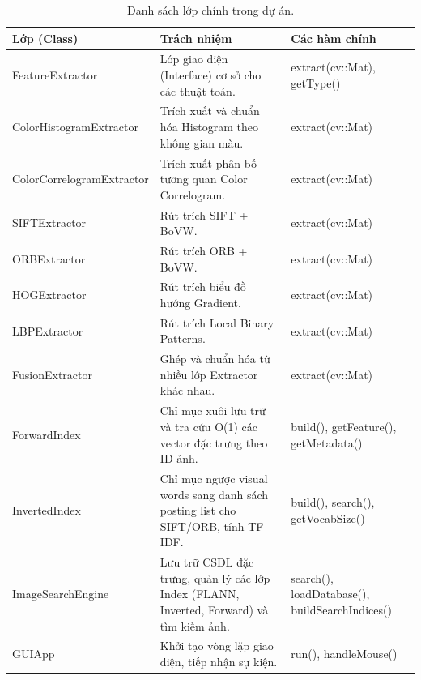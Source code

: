 \begin{table}[H]
\centering
\begin{tabularx}{\textwidth}{|>{\ttfamily}l|X|>{\ttfamily}l|}
\hline
\textbf{Lớp (Class)} & \textbf{Trách nhiệm} & \textbf{Các hàm chính} \\
\hline
FeatureExtractor & Lớp giao diện (Interface) cơ sở cho các thuật toán. & extract(cv::Mat), getType() \\
\hline
ColorHistogramExtractor & Trích xuất và chuẩn hóa Histogram theo không gian màu. & extract(cv::Mat) \\
\hline
ColorCorrelogramExtractor & Trích xuất phân bố tương quan Color Correlogram. & extract(cv::Mat) \\
\hline
SIFTExtractor & Rút trích SIFT + BoVW. & extract(cv::Mat) \\
\hline
ORBExtractor & Rút trích ORB + BoVW. & extract(cv::Mat) \\
\hline
HOGExtractor & Rút trích biểu đồ hướng Gradient. & extract(cv::Mat) \\
\hline
LBPExtractor & Rút trích Local Binary Patterns. & extract(cv::Mat) \\
\hline
FusionExtractor & Ghép và chuẩn hóa từ nhiều lớp Extractor khác nhau. & extract(cv::Mat) \\
\hline
ForwardIndex & Chỉ mục xuôi lưu trữ và tra cứu O(1) các vector đặc trưng theo ID ảnh. & build(), getFeature(), getMetadata() \\
\hline
InvertedIndex & Chỉ mục ngược visual words sang danh sách posting list cho SIFT/ORB, tính TF-IDF. & build(), search(), getVocabSize() \\
\hline
ImageSearchEngine & Lưu trữ CSDL đặc trưng, quản lý các lớp Index (FLANN, Inverted, Forward) và tìm kiếm ảnh. & search(), loadDatabase(), buildSearchIndices() \\
\hline
GUIApp & Khởi tạo vòng lặp giao diện, tiếp nhận sự kiện. & run(), handleMouse() \\
\hline
\end{tabularx}
\caption{Danh sách lớp chính trong dự án.}
\end{table}


